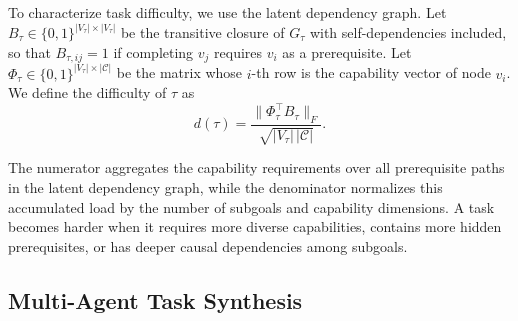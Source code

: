 \documentclass[11pt]{article}
\begin{document}
To characterize task difficulty, we use the latent dependency graph. 
Let $B_{\tau}\in\{0,1\}^{|V_{\tau}|\times |V_{\tau}|}$ be the transitive closure of $G_{\tau}$ with self-dependencies included, so that $B_{\tau,ij}=1$ if completing $v_j$ requires $v_i$ as a prerequisite. 
Let $\Phi_{\tau}\in\{0,1\}^{|V_{\tau}|\times |\mathcal{C}|}$ be the matrix whose $i$-th row is the capability vector of node $v_i$. 
We define the difficulty of $\tau$ as
\begin{equation}
    d(\tau) = \frac{\|\Phi_{\tau}^{\top} B_{\tau}\|_{F}}
    {\sqrt{|V_{\tau}|\,|\mathcal{C}|}}.
\end{equation}

The numerator aggregates the capability requirements over all prerequisite paths in the latent dependency graph, while the denominator normalizes this accumulated load by the number of subgoals and capability dimensions. 
A task becomes harder when it requires more diverse capabilities, contains more hidden prerequisites, or has deeper causal dependencies among subgoals.

\subsection{Multi-Agent Task Synthesis}
\label{sec: Multi-Agent Task Synthesis}

\begin{table}[t!]
\centering
\small
{}
\caption{Rule-based milestone checkers for the \textsc{MineExplorer} benchmark evaluation.}
\label{tab:milestone_rules}
\end{table}
\end{document}
